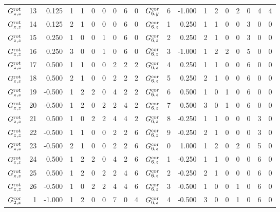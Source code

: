 \begin{tabular}{crrrrrrrrrcrrrrrrrrr}
$ G^{\rm rot}_{  z  ,z  }  $&    13  &  0.125 & 1 & 1 & 0 & 0 & 0 & 6 & 0 &     $    G^{\rm cor}_{6, y}  $&  6  & -1.000 & 1 & 2 & 0 & 2 & 0 & 4 & 4\\
$ G^{\rm rot}_{  z  ,z  }  $&    14  &  0.125 & 2 & 1 & 0 & 0 & 0 & 6 & 0 &     $    G^{\rm cor}_{6, z}  $&  1  &  0.250 & 1 & 1 & 0 & 0 & 3 & 0 & 0\\
$ G^{\rm rot}_{  z  ,z  }  $&    15  &  0.250 & 1 & 0 & 0 & 1 & 0 & 6 & 0 &     $    G^{\rm cor}_{6, z}  $&  2  &  0.250 & 2 & 1 & 0 & 0 & 3 & 0 & 0\\
$ G^{\rm rot}_{  z  ,z  }  $&    16  &  0.250 & 3 & 0 & 0 & 1 & 0 & 6 & 0 &     $    G^{\rm cor}_{6, z}  $&  3  & -1.000 & 1 & 2 & 2 & 0 & 5 & 0 & 0\\
$ G^{\rm rot}_{  z  ,z  }  $&    17  &  0.500 & 1 & 1 & 0 & 0 & 2 & 2 & 2 &     $    G^{\rm cor}_{6, z}  $&  4  &  0.250 & 1 & 1 & 0 & 0 & 6 & 0 & 0\\
$ G^{\rm rot}_{  z  ,z  }  $&    18  &  0.500 & 2 & 1 & 0 & 0 & 2 & 2 & 2 &     $    G^{\rm cor}_{6, z}  $&  5  &  0.250 & 2 & 1 & 0 & 0 & 6 & 0 & 0\\
$ G^{\rm rot}_{  z  ,z  }  $&    19  & -0.500 & 1 & 2 & 2 & 0 & 4 & 2 & 2 &     $    G^{\rm cor}_{6, z}  $&  6  &  0.500 & 1 & 0 & 1 & 0 & 6 & 0 & 0\\
$ G^{\rm rot}_{  z  ,z  }  $&    20  & -0.500 & 1 & 2 & 0 & 2 & 2 & 4 & 2 &     $    G^{\rm cor}_{6, z}  $&  7  &  0.500 & 3 & 0 & 1 & 0 & 6 & 0 & 0\\
$ G^{\rm rot}_{  z  ,z  }  $&    21  &  0.500 & 1 & 0 & 2 & 2 & 4 & 4 & 2 &     $    G^{\rm cor}_{6, z}  $&  8  & -0.250 & 1 & 1 & 0 & 0 & 0 & 3 & 0\\
$ G^{\rm rot}_{  z  ,z  }  $&    22  & -0.500 & 1 & 1 & 0 & 0 & 2 & 2 & 6 &     $    G^{\rm cor}_{6, z}  $&  9  & -0.250 & 2 & 1 & 0 & 0 & 0 & 3 & 0\\
$ G^{\rm rot}_{  z  ,z  }  $&    23  & -0.500 & 2 & 1 & 0 & 0 & 2 & 2 & 6 &     $    G^{\rm cor}_{6, z}  $&  0  &  1.000 & 1 & 2 & 0 & 2 & 0 & 5 & 0\\
$ G^{\rm rot}_{  z  ,z  }  $&    24  &  0.500 & 1 & 2 & 2 & 0 & 4 & 2 & 6 &     $    G^{\rm cor}_{6, z}  $&  1  & -0.250 & 1 & 1 & 0 & 0 & 0 & 6 & 0\\
$ G^{\rm rot}_{  z  ,z  }  $&    25  &  0.500 & 1 & 2 & 0 & 2 & 2 & 4 & 6 &     $    G^{\rm cor}_{6, z}  $&  2  & -0.250 & 2 & 1 & 0 & 0 & 0 & 6 & 0\\
$ G^{\rm rot}_{  z  ,z  }  $&    26  & -0.500 & 1 & 0 & 2 & 2 & 4 & 4 & 6 &     $    G^{\rm cor}_{6, z}  $&  3  & -0.500 & 1 & 0 & 0 & 1 & 0 & 6 & 0\\
$ G^{\rm cor}_{  2  ,x  }  $&     1  & -1.000 & 1 & 2 & 0 & 0 & 7 & 0 & 4 &     $    G^{\rm cor}_{6, z}  $&  4  & -0.500 & 3 & 0 & 0 & 1 & 0 & 6 & 0\\
        \hline
        \hline
            \end{tabular}